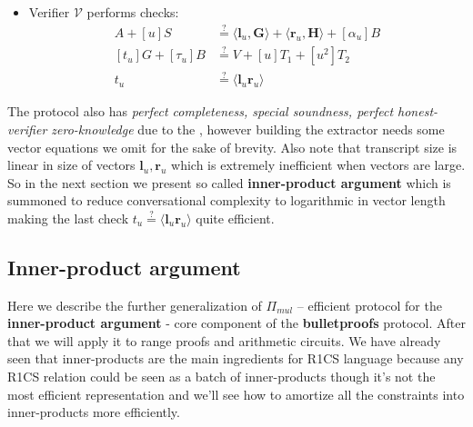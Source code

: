 \documentclass[../lecture-notes-148x210.tex]{subfiles}
\begin{document}
\begin{definition}
\begin{itemize}
\begin{equation}
            \end{equation}
            and sends $(\mathbf{l}_u, \mathbf{r}_u, t_u, \alpha_u, \tau_u)$ to $\mathcal{V}$.
        \item Verifier $\mathcal{V}$ performs checks: 
            \begin{equation}
                \begin{aligned}
                    A + [u]S &\stackrel{\text{?}}{=} \langle \mathbf{l}_u, \mathbf{G} \rangle + \langle \mathbf{r}_u, \mathbf{H} \rangle + [\alpha_u]B \\
                    [t_u]G + [\tau_u]B &\stackrel{\text{?}}{=} V + [u]T_1 + [u^2]T_2 \\
                    t_u &\stackrel{\text{?}}{=} \langle \mathbf{l}_u \mathbf{r}_u \rangle
                \end{aligned}
            \end{equation}
    \end{itemize}
\end{definition}

The protocol also has \textit{perfect completeness, special soundness, perfect honest-verifier zero-knowledge} due to the , however building the extractor needs some vector equations we omit for the sake of brevity. Also note that transcript size is linear in size of vectors $\mathbf{l}_u, \mathbf{r}_u$ which is extremely inefficient when vectors are large. So in the next section we present so called \textbf{inner-product argument} which is summoned to reduce conversational complexity to logarithmic in vector length making the last check $t_u \stackrel{\text{?}}{=} \langle \mathbf{l}_u \mathbf{r}_u \rangle$ quite efficient.

\subsection{Inner-product argument}

Here we describe the further generalization of $\Pi_{mul}$ -- efficient protocol for the \textbf{inner-product argument} - core component of the \textbf{bulletproofs} protocol. After that we will apply it to range proofs and arithmetic circuits. We have already seen that inner-products are the main ingredients for R1CS language because any R1CS relation could be seen as a batch of inner-products though it's not the most efficient representation and we'll see how to amortize all the constraints into inner-products more efficiently.
\end{document}
